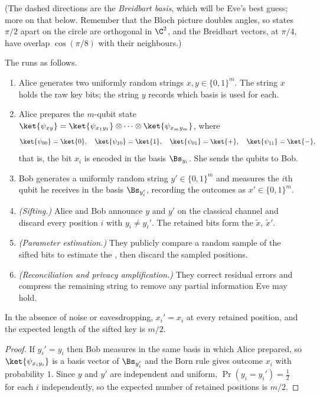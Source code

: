 (The dashed directions are the \emph{Breidbart basis}, which will be Eve's best guess; more on that below. Remember that the Bloch picture doubles angles, so states $\pi/2$ apart on the circle are orthogonal in $\C^2$, and the Breidbart vectors, at $\pi/4$, have overlap $\cos(\pi/8)$ with their neighbours.)

\begin{definition}[BB84]
	The  runs as follows.
	\begin{enumerate}[label=(\roman*)]
		\item Alice generates two uniformly random strings $x, y \in \{0,1\}^m$. The string $x$ holds the raw key bits; the string $y$ records which basis is used for each.
		\item Alice prepares the $m$-qubit state $\ket{\psi_{xy}} = \ket{\psi_{x_1y_1}}\otimes\cdots\otimes\ket{\psi_{x_my_m}}$, where
		$$\ket{\psi_{00}} = \ket{0},\quad \ket{\psi_{10}} = \ket{1},\quad\ket{\psi_{01}} = \ket{+},\quad\ket{\psi_{11}} = \ket{-},$$
		that is, the bit $x_i$ is encoded in the basis $\Bs_{y_i}$. She sends the qubits to Bob.
		\item Bob generates a uniformly random string $y'\in\{0,1\}^m$ and measures the $i$th qubit he receives in the basis $\Bs_{y_i'}$, recording the outcomes as $x'\in\{0,1\}^m$.
		\item \emph{(Sifting.)} Alice and Bob announce $y$ and $y'$ on the classical channel and discard every position $i$ with $y_i\neq y_i'$. The retained bits form the  $\widetilde x$, $\widetilde x'$.
		\item \emph{(Parameter estimation.)} They publicly compare a random sample of the sifted bits to estimate the , then discard the sampled positions.
		\item \emph{(Reconciliation and privacy amplification.)} They correct residual errors and compress the remaining string to remove any partial information Eve may hold.
	\end{enumerate}
\end{definition}

\begin{proposition}
	In the absence of noise or eavesdropping, $x_i' = x_i$ at every retained position, and the expected length of the sifted key is $m/2$.
\end{proposition}

\begin{proof}
	If $y_i' = y_i$ then Bob measures in the same basis in which Alice prepared, so $\ket{\psi_{x_iy_i}}$ is a basis vector of $\Bs_{y_i'}$ and the Born rule gives outcome $x_i$ with probability $1$. Since $y$ and $y'$ are independent and uniform, $\Pr(y_i = y_i') = \tfrac12$ for each $i$ independently, so the expected number of retained positions is $m/2$.
\end{proof}

